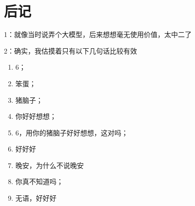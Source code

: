 
\chapter*{后记}

1：就像当时说弄个大模型，后来想想毫无使用价值，太中二了\par
2：确实，我估摸着只有以下几句话比较有效
\begin{enumerate}
	\item 6；
	\item 笨蛋；
	\item 猪脑子；
	\item 你好好想想；
	\item 6，用你的猪脑子好好想想，这对吗；
	\item 好好好
	\item 晚安，为什么不说晚安
	\item 你真不知道吗；
	\item 无语，好好好
\end{enumerate}



